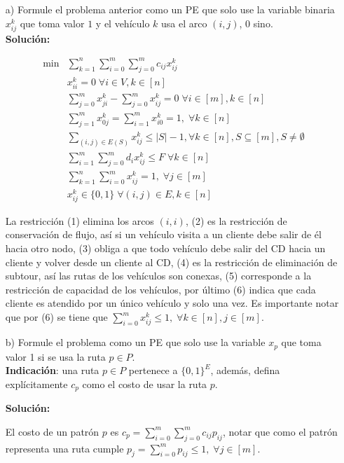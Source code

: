 \documentclass[10pt]{article}
\theoremstyle{plain}
\theoremstyle{definition}
\begin{document}
\begin{itemize}
\item[a)] Formule el problema anterior como un PE que solo use la variable binaria $x_{ij}^{k}$ que toma valor $1$ y el vehículo $k$ usa el arco $(i,j)$, 0 sino.\\

\textbf{Solución:}

\begin{align}
\min &\sum_{k=1}^{n}\sum_{i=0}^{m}\sum_{j=0}^{m} c_{ij}x_{ij}^{k}\nonumber\\ 
& x_{ii}^{k}=0 \; \forall i \in V, k \in [n]\\
& \sum_{j=0}^{m}x_{ji}^{k} - \sum_{j=0}^{m}x_{ij}^{k} = 0\; \forall i \in [m], k \in [n]\\
& \sum_{j=1}^{m}x_{0j}^{k}=\sum_{i=1}^{m}x_{i0}^{k}=1, \; \forall k \in [n]\\
& \sum_{(i,j)\in E(S)}x_{ij}^{k}\leq |S|-1, \forall k\in[n], S\subseteq [m], S\neq\emptyset\\
& \sum_{i=1}^{m}\sum_{j=0}^{m} d_{i}x_{ij}^{k}\leq F \; \forall k \in [n]\\
& \sum_{k=1}^{n}\sum_{i=0}^{m} x_{ij}^{k} = 1, \;\forall j \in [m]\\
& x_{ij}^{k}\in\{0,1\} \; \forall (i,j)\in E, k \in [n]\nonumber
\end{align}

La restricción (1) elimina los arcos $(i,i)$, (2) es la restricción de conservación de flujo, así si un vehículo visita a un cliente debe salir de él hacia otro nodo, (3) obliga a que todo vehículo debe salir del CD hacia un cliente y volver desde un cliente al CD, (4) es la restricción de eliminación de subtour, así las rutas de los vehículos son conexas, (5) corresponde a la restricción de capacidad de los vehículos, por último (6) indica que cada cliente es atendido por un único vehículo y solo una vez. Es importante notar que por (6) se tiene que $\sum_{i=0}^{m}x_{ij}^{k}\leq 1, \; \forall k \in [n], j \in [m]$.

\item[b)] Formule el problema como un PE que solo use la variable $x_{p}$ que toma valor 1 si se usa la ruta $p\in P$.\\ \textbf{Indicación}: una ruta $p\in P$ pertenece a $\{0,1\}^{E}$, además, defina explícitamente $c_{p}$ como el costo de usar la ruta $p$.

\textbf{Solución:}

El costo de un patrón $p$ es $c_{p}=\sum_{i=0}^{m}\sum_{j=0}^{m}c_{ij}p_{ij}$, notar que como el patrón representa una ruta cumple $p_{j}=\sum_{i=0}^{m}p_{ij}\leq 1, \;\forall j \in [m]$.


\end{itemize}
\end{document}
